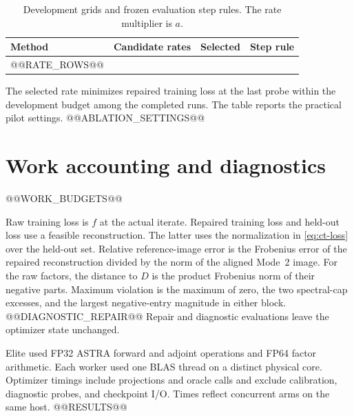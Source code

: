 \documentclass[11pt]{article}
\begin{document}
\begin{table}[htbp]
  \centering
  \caption{Development grids and frozen evaluation step rules. The rate multiplier is \(a\).}
  \label{tab:ct-rates}
  \begin{tabular}{@{}llcl@{}}
    \toprule
    Method & Candidate rates & Selected & Step rule \\
    \midrule
@@RATE_ROWS@@
    \bottomrule
  \end{tabular}
\end{table}

The selected rate minimizes repaired training loss at the last probe within
the development budget among the completed runs. The table reports the
practical pilot settings. @@ABLATION_SETTINGS@@

\section{Work accounting and diagnostics}
\label{sec:ct-work}

@@WORK_BUDGETS@@

Raw training loss is \(f\) at the actual iterate. Repaired training loss and
held-out loss use a feasible reconstruction. The latter uses the normalization in
\eqref{eq:ct-loss} over the held-out set. Relative reference-image error is the
Frobenius error of the repaired reconstruction divided by the norm of the
aligned Mode~2 image. For the raw factors, the distance to \(D\) is the product
Frobenius norm of their negative parts. Maximum violation is the maximum of zero,
the two spectral-cap excesses, and the largest negative-entry magnitude in
either block. @@DIAGNOSTIC_REPAIR@@
Repair and diagnostic evaluations leave the optimizer state unchanged.

Elite used FP32 ASTRA forward and adjoint operations and FP64 factor arithmetic. Each worker used one BLAS thread on a distinct physical core. Optimizer timings include projections and oracle calls and exclude calibration, diagnostic probes, and checkpoint I/O. Times reflect concurrent arms on the same host.
@@RESULTS@@
\end{document}
